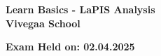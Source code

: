 \label{1.1.1 School Introduction}
\def \schoolname{Vivegaa School}
\def \examheldon{02.04.2025}

\renewcommand{\insertschoolname}{Vivegaa School}

\begin{frame}
\begin{center}
\begin{LARGE}
     \textbf{Learn Basics - LaPIS Analysis} \\
     \vspace{1cm}
     \textbf{\schoolname} \\
\end{LARGE}
\vspace{0.5cm}
\begin{Large}
    \textbf{Exam Held on: \examheldon}
\end{Large}
\end{center}


  
\end{frame}%

